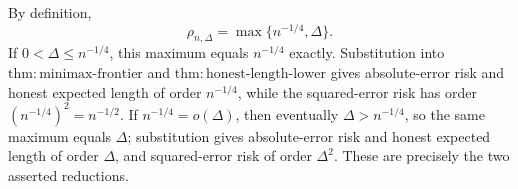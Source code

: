 By definition,
\[
 \rho_{n,\Delta}=\max\{n^{-1/4},\Delta\}.
\]
If \(0<\Delta\le n^{-1/4}\), this maximum equals \(n^{-1/4}\) exactly.  Substitution into \(\mathrm{thm:minimax\text{-}frontier}\) and \(\mathrm{thm:honest\text{-}length\text{-}lower}\) gives absolute-error risk and honest expected length of order \(n^{-1/4}\), while the squared-error risk has order \((n^{-1/4})^2=n^{-1/2}\).  If \(n^{-1/4}=o(\Delta)\), then eventually \(\Delta>n^{-1/4}\), so the same maximum equals \(\Delta\); substitution gives absolute-error risk and honest expected length of order \(\Delta\), and squared-error risk of order \(\Delta^2\).  These are precisely the two asserted reductions.